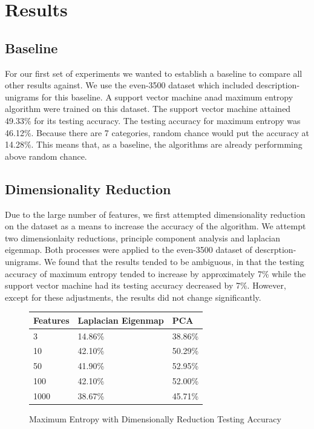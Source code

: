 \section{Results}
\subsection{Baseline}
For our first set of experiments we wanted to establish a baseline to compare all other results against.  We use the even-3500 dataset which included  description-unigrams for this baseline.  A support vector machine anad maximum entropy algorithm were trained on this dataset.  The support vector machine attained 49.33\% for its testing accuracy. The testing accuracy for maximum entropy was 46.12\%.  Because there are 7 categories, random chance would put the accuracy at 14.28\%.  This means that, as a baseline, the algorithms are already performming above random chance.

\subsection{Dimensionality Reduction}
Due to the large number of features, we first attempted dimensionality reduction on the dataset as a means to increase the accuracy of the algorithm.  We attempt two dimensionlaity reductions, principle component analysis and laplacian eigenmap. Both processes were applied to the even-3500 dataset of descrption-unigrams.  We found that the results tended to be ambiguous, in that the testing accuracy of maximum entropy tended to increase by approximately 7\% while the support vector machine had its testing accuracy decreased by 7\%.  However, except for these adjustments, the results did not change significantly.
\\
\begin{figure}[!ht]
\begin{center}
\caption{Maximum Entropy with Dimensionally Reduction Testing Accuracy}
\begin{tabular}[!Ht]{| l | l | l |}
\hline
Features & Laplacian Eigenmap & PCA \\ \hline
3 & 14.86\% & 38.86\% \\ \hline
10 & 42.10\% & 50.29\% \\ \hline
50 & 41.90\% &  52.95\% \\ \hline
100 & 42.10\% & 52.00\%	 \\ \hline
1000 & 38.67\% & 45.71\% \\ \hline
\end{tabular}
\end{center}
\end{figure}

